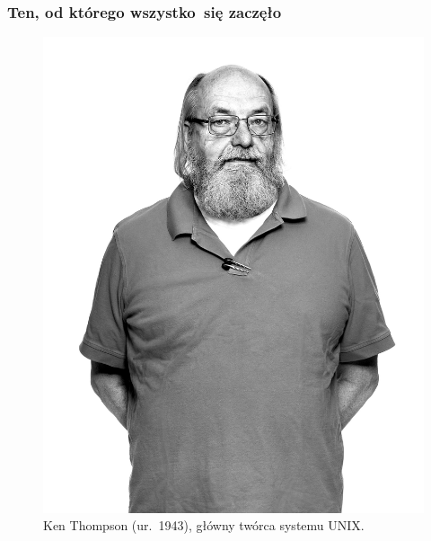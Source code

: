 \documentclass[10pt,t]{beamer}
\begin{document}
\begin{frame}
  \frametitle{Ten, od którego wszystko~się zaczęło}


  \begin{figure}

    \centering

    \includegraphics[scale=0.09]
    {./PresentationsPictures/OS-heroes-Pictures/Ken-Thompson.jpg}

    \caption{Ken Thompson (ur.~1943), główny twórca systemu UNIX.}

    \label{fig:Ken-Thompson}

  \end{figure}

\end{frame}
\end{document}
